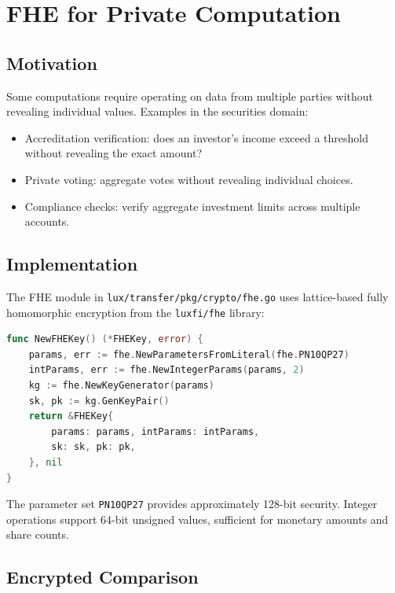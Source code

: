 \documentclass[11pt,a4paper]{article}
\begin{document}
\section{FHE for Private Computation}
\label{sec:fhe}

\subsection{Motivation}

Some computations require operating on data from multiple parties without
revealing individual values.  Examples in the securities domain:
\begin{itemize}[nosep]
  \item Accreditation verification: does an investor's income exceed
        a threshold without revealing the exact amount?
  \item Private voting: aggregate votes without revealing individual choices.
  \item Compliance checks: verify aggregate investment limits across
        multiple accounts.
\end{itemize}

\subsection{Implementation}

The FHE module in \texttt{lux/transfer/pkg/crypto/fhe.go} uses lattice-based
fully homomorphic encryption from the \texttt{luxfi/fhe} library:

\begin{lstlisting}[language=Go,caption={fhe.go: parameter initialization}]
func NewFHEKey() (*FHEKey, error) {
    params, err := fhe.NewParametersFromLiteral(fhe.PN10QP27)
    intParams, err := fhe.NewIntegerParams(params, 2)
    kg := fhe.NewKeyGenerator(params)
    sk, pk := kg.GenKeyPair()
    return &FHEKey{
        params: params, intParams: intParams,
        sk: sk, pk: pk,
    }, nil
}
\end{lstlisting}

The parameter set \texttt{PN10QP27} provides approximately 128-bit security.
Integer operations support 64-bit unsigned values, sufficient for monetary
amounts and share counts.

\subsection{Encrypted Comparison}
\end{document}

